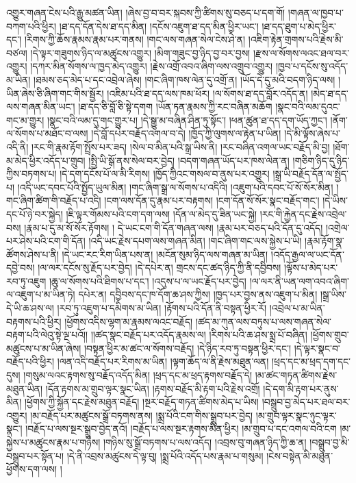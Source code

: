 འགྱུར་གཞན་ངེས་པའི་རྒྱུ་མཚན་ཡིན། །ཞེས་བྱ་བ་བར་སྐབས་ཀྱི་ཚིགས་སུ་བཅད་པ་དག་གོ། །གཞན་ལ་ཁྱབ་པ་བཀག་པའི་ཕྱིར། །ཐ་དད་དོན་དེས་ཐ་དད་མིན། །དངོས་འཇུག་ཐ་དད་མིན་ཕྱིར་ཡང་། །ཐ་དད་ཐུག་པ་མེད་ཕྱིར་དང་། །རིགས་ཀྱི་ཆོས་རྣམས་རྣམ་པར་གནས། །གང་ལས་གཞན་སེལ་ངེས་ཤེ་ན། །འཇིག་རྟེན་གྲགས་པའི་རྗེས་མི་བཙལ། །དེ་ལྟར་གཟུགས་ཉིད་ལ་མཚུངས་འགྱུར། །མིག་གཟུང་བྱ་ཉིད་བྱ་བར་བྱས། །རྫས་ལ་སོགས་ལའང་ཐལ་བར་འགྱུར། །དཀར་མིན་སོགས་ལ་ཁྱད་མེད་འགྱུར། །རྗེས་འགྲོ་འབའ་ཞིག་ལས་འགྲུབ་འགྱུར། །ཁྱབ་པ་དངོས་སུ་འདོད་མ་ཡིན། །ཐམས་ཅད་མེད་པ་དང་འབྲེལ་ཞེས། །གང་ཞིག་ཁས་ལེན་དུ་འགྲོ་ན། །ཡོད་དེ་དུ་མའི་བདག་ཉིད་ལས། །ཡིན་ཞེས་ཅི་ཞིག་གང་གིས་སྦྱོར། །འཇིམ་པའི་ཐ་དད་ལས་ཁམ་ཕོར། །ལ་སོགས་ཐ་དད་བློར་འདོད་ན། །མེད་ཐ་དད་ལས་གཞན་མིན་ཡང་། །ཐ་དད་ཅི་བློ་ཅི་སྟེ་དགག །ཡོན་ཏན་རྣམས་ཀྱི་རང་བཞིན་མཆོག །སྣང་བའི་ལམ་དུའང་གང་མ་གྱུར། །སྣང་བའི་ལམ་དུ་གང་གྱུར་པ། །དེ་སྒྱུ་མ་བཞིན་ཤིན་ཏུ་སྟོང་། །ཕན་ཚུན་ཐ་དད་དག་ཡོད་ཀྱང་། །ནོག་ལ་སོགས་པ་མཐོང་བ་ལས། །དེ་བློ་དཔེར་བརྗོད་འགལ་བ་དེ། །ཁྱོད་ཀྱི་ལུགས་ལ་རྟེན་པ་ཡིན། །དེ་མི་ལྟོས་ཞེས་པ་འདི་ནི། །རང་གི་རྣམ་རྟོག་སྤྲོས་པར་ཟད། །སེལ་བ་མིན་པའི་སྒྲ་ཡིས་ནི། །རང་བཞིན་འགལ་ཡང་བརྗོད་མི་བྱ། །ཐོག་མ་མེད་ཕྱིར་འདོད་པ་གྲུབ། །སྤྱི་ཡི་སྒོ་ནས་སེལ་བར་བྱེད། །བདག་གཞན་ཡོད་པར་ཁས་ལེན་ན། །གཅིག་ཉིད་དུ་ཉིད་ཀྱིས་བཏགས་པ། །དེ་དག་དངོས་པོ་ལ་མི་རིགས། །ཁྱོད་ཀྱིའང་གསལ་བ་ནུས་པར་འགྱུར། །སྒྲ་ཡི་བརྗོད་དོན་ལ་སྤྱོད་པ། །འདི་ཡང་དབང་པོའི་སྤྱོད་ཡུལ་མིན། །གང་ཞིག་སྒྲ་ལ་སོགས་པ་འདིའི། །འཇུག་པའི་དབང་པོ་སོ་སོར་མིན། །གང་ཞིག་ཚིག་གི་བརྗོད་པ་འདི། །ངག་ལས་དོན་དུ་རྣམ་པར་བརྟགས། །ངག་དོན་སོ་སོར་སྣང་བརྗོད་གང་། །དེ་ཡིས་དང་པོ་ཉེ་བར་སྐྱེད། །ཇི་ལྟར་གོམས་པའི་ངག་དག་ལས། །དོན་ལ་མེད་དུ་ཟིན་ཡང་སྐྱེ། །རང་གི་རྐྱེན་དང་རྗེས་འབྲེལ་བས། །རྣམ་པ་དུ་མ་སོ་སོར་རྟོགས། །
དེ་ཡང་ངག་གི་དོན་གཞན་ལས། །རྣམ་པར་བཅད་པའི་དོན་དུ་འདོད། །འགྲེལ་པར་ཤེས་པའི་ངག་གི་དོན། །འདི་ཡང་རྗེས་དཔག་ལས་གཞན་མིན། །གང་ཞིག་གང་ལས་སྐྱེས་པ་ཡི། །རྣམ་རྟོག་སྣ་ཚོགས་ཤེས་པ་ནི། །དེ་ཡང་རང་རིག་ཡིན་པས་ན། །མངོན་སུམ་ཉིད་ལས་གཞན་མ་ཡིན། །འདོད་རྒྱལ་ལ་ཡང་དོན་དབྱེ་བས། །ལ་ལར་དངོས་སུ་རྗོད་པར་བྱེད། །དེ་དཔེར་ན། གྲངས་དང་ཚད་ཉིད་ཀྱི་ནི་དབྱིབས། །ལྟོས་པ་མེད་པར་རབ་ཏུ་འཇུག །ཆུ་ལ་སོགས་པའི་ཐིགས་པ་དང་། །འདུས་པ་ལ་ཡང་རྗོད་པར་བྱེད། །ལ་ལར་ནི་ཡན་ལག་འབའ་ཞིག་ལ་འཇུག་པ་མ་ཡིན་ཏེ། དཔེར་ན། དབྱིབས་དང་ཁ་དོག་ཆ་ཤས་ཀྱིས། །ཁྱད་པར་བྱས་ནས་འཇུག་པ་མིན། །སྒྲ་ཡིས་དེ་ཡི་ཆ་ཤས་ལ། །རབ་ཏུ་འཇུག་པ་དམིགས་མ་ཡིན། །རྟོགས་པའི་དོན་ནི་བསྟན་ཕྱིར་རོ། །འབྲེལ་པ་མ་ཡིན་བརྟགས་པའི་ཕྱིར། །ཕྱོགས་འདིས་ལྷག་མ་རྣམས་ལའང་བརྗོད། །ཚད་མ་ཀུན་ལས་བཏུས་པ་ལས་གཞན་སེལ་བརྟག་པའི་ལེའུ་སྟེ་ལྔ་པའོ།། །།ཚད་སྣང་བརྗོད་པར་འདོད་རྣམས་ལ། །རིགས་པའི་ཆ་ཤས་སྨྲ་པོ་བཞིན། །ཕྱོགས་གྲུབ་མཚུངས་པ་མ་ཡིན་ཞེས། །བསྟན་ཕྱིར་མ་ཚང་ལ་སོགས་བརྗོད། །དེ་ཉིད་རབ་ཏུ་བསྟན་ཕྱིར་དང་། །དེ་ལྟར་སྣང་བ་བརྗོད་པའི་ཕྱིར། །ལན་འདི་བརྗོད་པར་རིགས་མ་ཡིན། །ལྟག་ཆོད་ལ་ནི་རྗེས་མཐུན་ལན། །ཕྲད་དང་མ་ཕྲད་དག་དང་དུས། །གསུམ་ལའང་རྟགས་སུ་བརྗོད་འདོད་མིན། །ཕྲད་དང་མ་ཕྲད་རྟགས་བརྗོད་དེ། །མ་ཚང་གཏན་ཚིགས་རྗེས་མཐུན་ཡིན། །དོན་རྟགས་མ་གྲུབ་ལྟར་སྣང་ཡིན། །རྟགས་བརྗོད་མི་རྟག་པའི་རྗེས་འགྲོ། །དེ་དག་མི་རྟག་པར་ནུས་མིན། །ཕྱོགས་ཀྱི་སྐྱོན་དང་རྗེས་མཐུན་བརྗོད། །སྔར་བརྗོད་གཏན་ཚིགས་མེད་པ་ཡིས། །བསྒྲུབ་བྱ་མེད་པར་ཐལ་བར་འགྱུར། །མ་བརྗོད་པར་མཚུངས་སྒྲོ་བཏགས་ནས། །སྨྲ་པོའི་ངག་གིས་སྒྲུབ་པར་བྱེད། །མ་གྲུབ་ལྟར་སྣང་ཉུང་ལྟར་སྣང་། །བརྗོད་པ་ལས་སྔར་སྒྲུབ་བྱེད་ནའོ། །བརྗོད་པ་ལས་སྔར་རྟགས་མིན་ཕྱིར། །མ་གྲུབ་པ་དང་འགལ་བའི་ངག །མ་སྐྱེས་པ་མཚུངས་རྣམ་པ་གཉིས། །གཉིས་སུ་སྒྲོ་བཏགས་པ་ལས་འདོད། །འབྲས་བུ་གཞན་ཉིད་ཀྱི་ཆ་ན། །བསྒྲུབ་བྱ་མི་བསྒྲུབ་པར་སྟོན་པ། །དེ་ནི་འབྲས་མཚུངས་དེ་ལྟ་བུ། །སྨྲ་པོའི་འདོད་པས་རྣམ་པ་གསུམ། །ངེས་བསྟེན་མི་མཐུན་ཕྱོགས་དག་ལས། །
